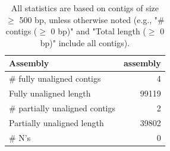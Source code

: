 \documentclass[12pt,a4paper]{article}
\begin{document}
\begin{table}[ht]
\begin{center}
\caption{All statistics are based on contigs of size $\geq$ 500 bp, unless otherwise noted (e.g., "\# contigs ($\geq$ 0 bp)" and "Total length ($\geq$ 0 bp)" include all contigs).}
\begin{tabular}{|l*{1}{|r}|}
\hline
Assembly & assembly \\ \hline
\# fully unaligned contigs & 4 \\ \hline
Fully unaligned length & 99119 \\ \hline
\# partially unaligned contigs & 2 \\ \hline
Partially unaligned length & 39802 \\ \hline
\# N's & 0 \\ \hline
\end{tabular}
\end{center}
\end{table}
\end{document}
